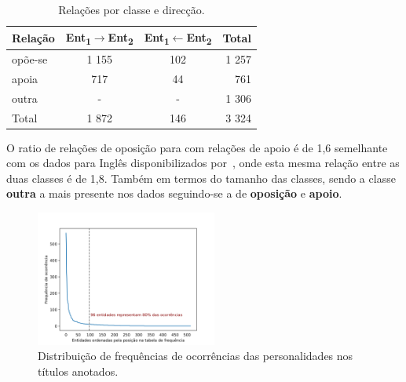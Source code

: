 \documentclass[a4paper, twocolumn, 11pt, twoside]{article}
\begin{document}

\begin{table}[!h]
    \begin{center}
    \begin{tabular}{l ccr}
        {\bf Relação} & {\bf \footnotesize{Ent\textsubscript{1}$\rightarrow$Ent\textsubscript{2}}} & {\bf \footnotesize{Ent\textsubscript{1}$\leftarrow$Ent\textsubscript{2}}} & {\bf Total} \\
        \hline
        opõe-se          &  1 155  &  102  &  1 257  \\
        apoia            &    717  &   44  &    761  \\
        outra            &    -    &   -   &  1 306  \\
		\hline
		Total			 &  1 872  &  146  &  3 324  \\
    \end{tabular}
	\caption{Relações por classe e direcção.}
	\label{tab:rel_dataset}
	\end{center}
\end{table}

O ratio de relações de oposição para com relações de apoio é de 1,6 semelhante com os dados para Inglês disponibilizados por~\cite{park-etal-2021-blames}, onde esta mesma relação entre as duas classes é de 1,8. Também em termos do tamanho das classes, sendo a classe \textbf{outra} a mais presente nos dados seguindo-se a de \textbf{oposição} e \textbf{apoio}.





\begin{figure}
  \centering
    \includegraphics[width=0.53\textwidth]{power_law_ent_freq.png}
  \caption{Distribuição de frequências de ocorrências das personalidades nos títulos anotados.}
  \label{fig:ent_power_law}
\end{figure}
\end{document}
